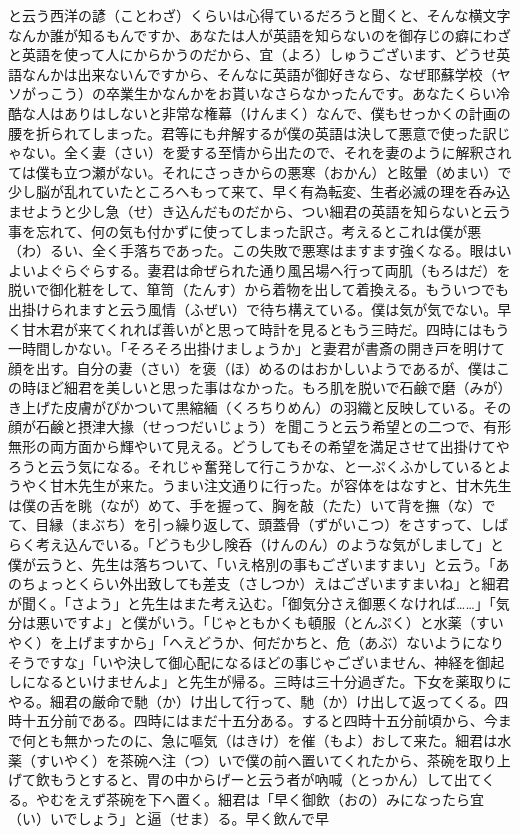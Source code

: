 と云う西洋の諺（ことわざ）くらいは心得ているだろうと聞くと、そんな横文字なんか誰が知るもんですか、あなたは人が英語を知らないのを御存じの癖にわざと英語を使って人にからかうのだから、宜（よろ）しゅうございます、どうせ英語なんかは出来ないんですから、そんなに英語が御好きなら、なぜ耶蘇学校（ヤソがっこう）の卒業生かなんかをお貰いなさらなかったんです。あなたくらい冷酷な人はありはしないと非常な権幕（けんまく）なんで、僕もせっかくの計画の腰を折られてしまった。君等にも弁解するが僕の英語は決して悪意で使った訳じゃない。全く妻（さい）を愛する至情から出たので、それを妻のように解釈されては僕も立つ瀬がない。それにさっきからの悪寒（おかん）と眩暈（めまい）で少し脳が乱れていたところへもって来て、早く有為転変、生者必滅の理を呑み込ませようと少し急（せ）き込んだものだから、つい細君の英語を知らないと云う事を忘れて、何の気も付かずに使ってしまった訳さ。考えるとこれは僕が悪（わ）るい、全く手落ちであった。この失敗で悪寒はますます強くなる。眼はいよいよぐらぐらする。妻君は命ぜられた通り風呂場へ行って両肌（もろはだ）を脱いで御化粧をして、箪笥（たんす）から着物を出して着換える。もういつでも出掛けられますと云う風情（ふぜい）で待ち構えている。僕は気が気でない。早く甘木君が来てくれれば善いがと思って時計を見るともう三時だ。四時にはもう一時間しかない。「そろそろ出掛けましょうか」と妻君が書斎の開き戸を明けて顔を出す。自分の妻（さい）を褒（ほ）めるのはおかしいようであるが、僕はこの時ほど細君を美しいと思った事はなかった。もろ肌を脱いで石鹸で磨（みが）き上げた皮膚がぴかついて黒縮緬（くろちりめん）の羽織と反映している。その顔が石鹸と摂津大掾（せっつだいじょう）を聞こうと云う希望との二つで、有形無形の両方面から輝やいて見える。どうしてもその希望を満足させて出掛けてやろうと云う気になる。それじゃ奮発して行こうかな、と一ぷくふかしているとようやく甘木先生が来た。うまい注文通りに行った。が容体をはなすと、甘木先生は僕の舌を眺（なが）めて、手を握って、胸を敲（たた）いて背を撫（な）でて、目縁（まぶち）を引っ繰り返して、頭蓋骨（ずがいこつ）をさすって、しばらく考え込んでいる。「どうも少し険呑（けんのん）のような気がしまして」と僕が云うと、先生は落ちついて、「いえ格別の事もございますまい」と云う。「あのちょっとくらい外出致しても差支（さしつか）えはございますまいね」と細君が聞く。「さよう」と先生はまた考え込む。「御気分さえ御悪くなければ\ldots{}\ldots{}」「気分は悪いですよ」と僕がいう。「じゃともかくも頓服（とんぷく）と水薬（すいやく）を上げますから」「へえどうか、何だかちと、危（あぶ）ないようになりそうですな」「いや決して御心配になるほどの事じゃございません、神経を御起しになるといけませんよ」と先生が帰る。三時は三十分過ぎた。下女を薬取りにやる。細君の厳命で馳（か）け出して行って、馳（か）け出して返ってくる。四時十五分前である。四時にはまだ十五分ある。すると四時十五分前頃から、今まで何とも無かったのに、急に嘔気（はきけ）を催（もよ）おして来た。細君は水薬（すいやく）を茶碗へ注（つ）いで僕の前へ置いてくれたから、茶碗を取り上げて飲もうとすると、胃の中からげーと云う者が吶喊（とっかん）して出てくる。やむをえず茶碗を下へ置く。細君は「早く御飲（おの）みになったら宜（い）いでしょう」と逼（せま）る。早く飲んで早